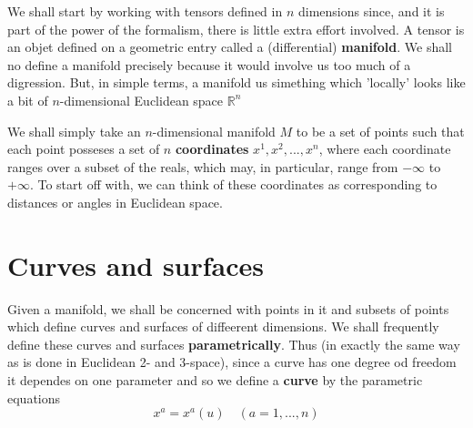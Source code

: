 We shall start by working with tensors defined in $n$ dimensions since, and it is part of the power of the formalism, there is little extra effort involved. A tensor is an objet defined on a geometric entry called a (differential) \textbf{manifold}. We shall no define a manifold precisely because it would involve us too much of a digression. But, in simple terms, a manifold us simething which 'locally' looks like a bit of $n$-dimensional Euclidean space $\mathbb{R}^{n}$

We shall simply take an $n$-dimensional manifold $M$ to be a set of points such that each point posseses a set of $n$ \textbf{coordinates} $x^{1},x^{2},...,x^{n}$, where each coordinate ranges over a subset of the reals, which may, in particular, range from $-\infty$ to $+\infty$. To start off with, we can think of these coordinates as corresponding to distances or angles in Euclidean space.

\section{Curves and surfaces}
Given a manifold, we shall be concerned with points in it and subsets of points which define curves and surfaces of diffeerent dimensions. We shall frequently define these curves and surfaces \textbf{parametrically}. Thus (in exactly the same way as is done in Euclidean 2- and 3-space), since a curve has one degree od freedom it dependes on one parameter and so we define a \textbf{curve} by the parametric equations
\begin{equation}\label{5.1}
  \boxed{x^{{a}}=x^{{a}}(u)\quad (a=1,...,n)}
\end{equation}
